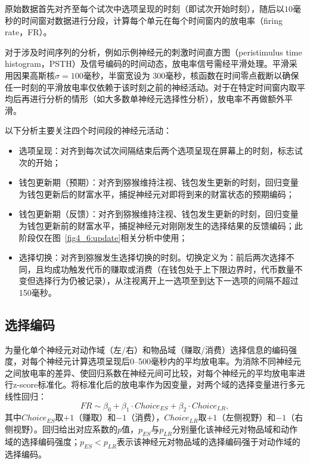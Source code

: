 原始数据首先对齐至每个试次中选项呈现的时刻（即试次开始时刻），随后以$10$毫秒的时间窗对数据进行分段，计算每个单元在每个时间窗内的放电率（firing rate，FR）。

对于涉及时间序列的分析，例如示例神经元的刺激时间直方图（peristimulus time histogram，PSTH）及信号编码的时间动态，放电率信号需经平滑处理。平滑采用因果高斯核$\sigma = 100$毫秒，半窗宽设为 $300$毫秒，核函数在时间零点截断以确保任一时刻的平滑放电率仅依赖于该时刻之前的神经活动。对于在特定时间窗内取平均后再进行分析的情形（如大多数单神经元选择性分析），放电率不再做额外平滑。

以下分析主要关注四个时间段的神经元活动：
\begin{itemize}
    \item 选项呈现：对齐到每次试次间隔结束后两个选项呈现在屏幕上的时刻，标志试次的开始；
    \item 钱包更新期（预期）：对齐到猕猴维持注视、钱包发生更新的时刻，回归变量为钱包更新后的财富水平，捕捉神经元对即将到来的财富状态的预期编码；
    \item 钱包更新期（反馈）：对齐到猕猴维持注视、钱包发生更新的时刻，回归变量为钱包更新前的财富水平，捕捉神经元对刚刚发生的选择结果的反馈编码；此阶段仅在图~\ref{fig4_6:update}相关分析中使用；
    \item 选择切换：对齐到猕猴发生选择切换的时刻。切换定义为：前后两次选择不同，且均成功触发代币的赚取或消费（在钱包处于上下限边界时，代币数量不变但选择行为仍被记录），从注视离开上一选项至到达下一选项的间隔不超过150毫秒。
\end{itemize}

\subsection{选择编码}\label{chap2:methods_neural_choice}
为量化单个神经元对动作域（左/右）和物品域（赚取/消费）选择信息的编码强度，对每个神经元计算选项呈现后0--500毫秒内的平均放电率。为消除不同神经元之间放电率的差异、使回归系数在神经元间可比较，对每个神经元的平均放电率进行z-score标准化。将标准化后的放电率作为因变量，对两个域的选择变量进行多元线性回归：
\begin{equation}
    FR \sim \beta_0 + \beta_1 \cdot Choice_{ES} + \beta_2 \cdot Choice_{LR},
\end{equation}
其中$Choice_{ES}$取$+1$（赚取）和$-1$（消费），$Choice_{LR}$取$+1$（左侧视野）和$-1$（右侧视野）。回归给出对应系数的$p$值，$p_{ES}$与$p_{LR}$分别量化该神经元对物品域和动作域的选择编码强度；$p_{ES} < p_{LR}$表示该神经元对物品域的选择编码强于对动作域的选择编码。

